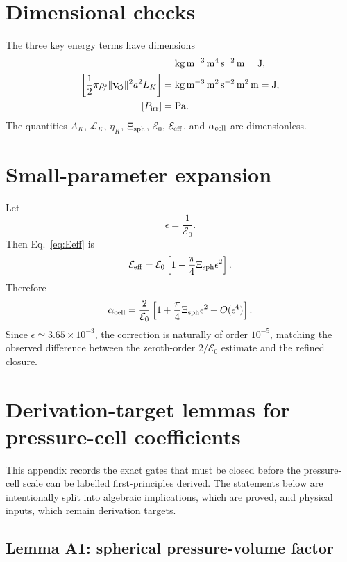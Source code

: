 \documentclass[11pt]{article}
\newcommand{\vnorm}{\lVert\mathbf{v}_{\!\boldsymbol{\circlearrowleft}}\rVert}
\newcommand{\rhof}{\rho_{\!f}}
\newcommand{\LK}{\mathcal L_K}
\newcommand{\Ezero}{\mathcal E_0}
\newcommand{\Eeff}{\mathcal E_{\rm eff}}
\newcommand{\Xisph}{\Xi_{\rm sph}}
\newcommand{\alphacell}{\alpha_{\rm cell}}
\begin{document}
\appendix

\section{Dimensional checks}

The three key energy terms have dimensions
\begin{align}
  [\rhof\Gamma_0^2L_K]
  &=
  \mathrm{kg\,m^{-3}}\,
  \mathrm{m^4\,s^{-2}}\,
  \mathrm{m}
  =
  \mathrm{J},\\
  \left[\frac{1}{2}\pi\rhof\vnorm^2a^2L_K\right]
  &=
  \mathrm{kg\,m^{-3}}\,
  \mathrm{m^2\,s^{-2}}\,
  \mathrm{m^2}\,
  \mathrm{m}
  =
  \mathrm{J},\\
  [P_{\rm irr}]
  &=
  \mathrm{Pa}.
\end{align}
The quantities \(A_K\), \(\LK\), \(\eta_K\), \(\Xisph\), \(\Ezero\), \(\Eeff\), and
\(\alphacell\) are dimensionless.

\section{Small-parameter expansion}

Let
\[
  \epsilon=\frac{1}{\Ezero}.
\]
Then Eq.~\eqref{eq:Eeff} is
\[
  \Eeff
  =
  \Ezero
  \left[
  1-\frac{\pi}{4}\Xisph\epsilon^2
  \right].
\]
Therefore
\[
  \alphacell
  =
  \frac{2}{\Ezero}
  \left[
  1+\frac{\pi}{4}\Xisph\epsilon^2
  +O(\epsilon^4)
  \right].
\]
Since \(\epsilon\simeq3.65\times10^{-3}\), the correction is naturally of order
\(10^{-5}\), matching the observed difference between the zeroth-order
\(2/\Ezero\) estimate and the refined closure.


\section{Derivation-target lemmas for pressure-cell coefficients}
\label{app:pressure-coefficient-targets}

This appendix records the exact gates that must be closed before the
pressure-cell scale can be labelled first-principles derived.  The statements
below are intentionally split into algebraic implications, which are proved,
and physical inputs, which remain derivation targets.

\subsection{Lemma A1: spherical pressure-volume factor}
\end{document}
